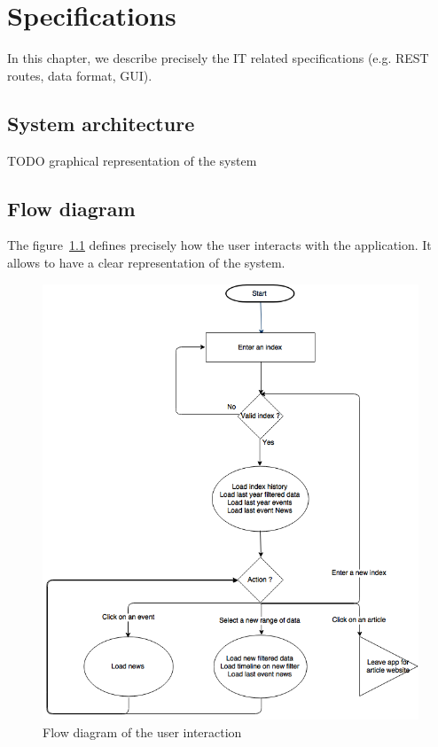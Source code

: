 \chapter{Specifications}
\label{chapter:specifications}
In this chapter, we describe precisely the IT related specifications (e.g. REST routes, data format, GUI).

\section{System architecture}
TODO graphical representation of the system

\section{Flow diagram}
The figure~\ref{fig:specs:flowdiagram} defines precisely how the user interacts with the application. It allows to have a clear representation of the system.

\begin{figure}[H]
    \centering
\includegraphics[scale=0.5]{Figures/workflow-stockstrooper.png}
\caption{Flow diagram of the user interaction}
\label{fig:specs:flowdiagram}
\end{figure}


